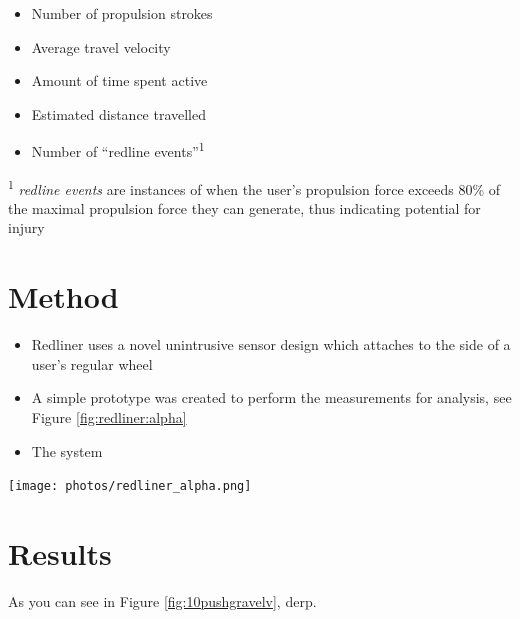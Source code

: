 \documentclass[a0,landscape]{a0poster}
\newenvironment{Figure}
  {\par\medskip\noindent\minipage{\linewidth}}
  {\endminipage\par\medskip}
\begin{document}
\begin{multicols*}{3}
\begin{itemize}
    \item Number of propulsion strokes
    \item Average travel velocity
    \item Amount of time spent active
    \item Estimated distance travelled
    \item Number of ``redline events''\textsuperscript{1}
\end{itemize}

\textsuperscript{1} \textit{redline events} are instances of when the user's propulsion force exceeds 80\% of the maximal propulsion force they can generate, thus indicating potential for injury

\section*{Method}

\begin{itemize}
    \item Redliner uses a novel unintrusive sensor design which attaches to the side of a user's regular wheel
    \item A simple prototype was created to perform the measurements for analysis, see Figure \ref{fig:redliner:alpha}
    \item The system 
\end{itemize}

\begin{Figure}
    \centering
    \texttt{[image: photos/redliner\_alpha.png]}
    \label{fig:redliner:alpha}
\end{Figure}

\section*{Results}

As you can see in Figure \ref{fig:10pushgravelv}, derp.


\end{multicols*}
\end{document}
